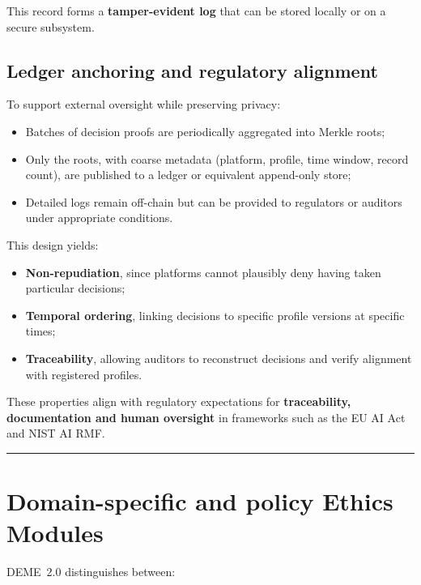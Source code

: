 \documentclass[11pt]{article}
\begin{document}
This record forms a \textbf{tamper-evident log} that can be stored locally or on a secure subsystem.

\subsection{Ledger anchoring and regulatory alignment}

To support external oversight while preserving privacy:

\begin{itemize}
  \item Batches of decision proofs are periodically aggregated into Merkle roots;
  \item Only the roots, with coarse metadata (platform, profile, time window, record count), are published to a ledger or equivalent append-only store;
  \item Detailed logs remain off-chain but can be provided to regulators or auditors under appropriate conditions.
\end{itemize}

This design yields:

\begin{itemize}
  \item \textbf{Non-repudiation}, since platforms cannot plausibly deny having taken particular decisions;
  \item \textbf{Temporal ordering}, linking decisions to specific profile versions at specific times;
  \item \textbf{Traceability}, allowing auditors to reconstruct decisions and verify alignment with registered profiles.
\end{itemize}

These properties align with regulatory expectations for \textbf{traceability, documentation and human oversight} in frameworks such as the EU AI Act and NIST AI RMF.

\hrule
\vspace{1em}

\section{Domain-specific and policy Ethics Modules}

DEME~2.0 distinguishes between:
\end{document}

